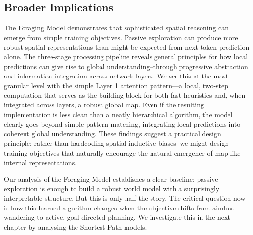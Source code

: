 \subsection{Broader Implications}

The Foraging Model demonstrates that sophisticated spatial reasoning can emerge from simple training objectives. Passive exploration can produce more robust spatial representations than might be expected from next-token prediction alone. The three-stage processing pipeline reveals general principles for how local predictions can give rise to global understanding--through progressive abstraction and information integration across network layers. We see this at the most granular level with the simple Layer 1 attention pattern—a local, two-step computation that serves as the building block for both fast heuristics and, when integrated across layers, a robust global map. Even if the resulting implementation is less clean than a neatly hierarchical algorithm, the model clearly goes beyond simple pattern matching, integrating local predictions into coherent global understanding. These findings suggest a practical design principle: rather than hardcoding spatial inductive biases, we might design training objectives that naturally encourage the natural emergence of map-like internal representations. 

Our analysis of the Foraging Model establishes a clear baseline: passive exploration is enough to build a robust world model with a surprisingly interpretable structure. But this is only half the story. The critical question now is how this learned algorithm changes when the objective shifts from aimless wandering to active, goal-directed planning.  We investigate this in the next chapter by analysing the Shortest Path models.

